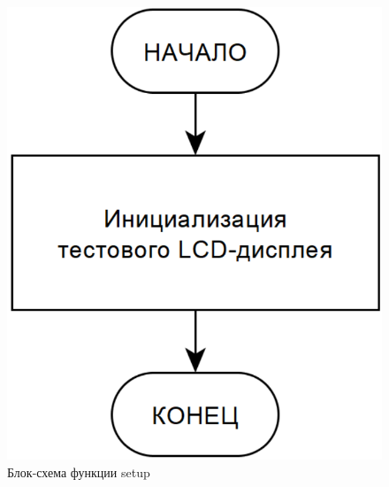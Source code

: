 \documentclass{altsu-report}
\begin{document}
\begin{figure}[H]
    \centering
    \includegraphics[scale=0.3]{setup.png}
    \caption{Блок-схема функции setup}
    \label{fig:setup}
\end{figure}
\end{document}
